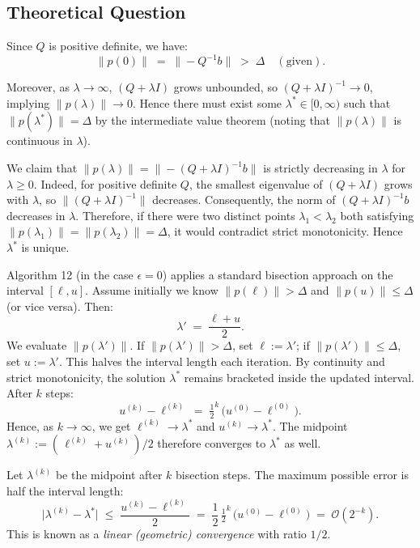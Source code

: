 \documentclass[12pt]{article}
\begin{document}
\subsection{Theoretical Question}
Since \(Q\) is positive definite, we have:
\[
\|p(0)\| \;=\;\|-Q^{-1}b\|\;>\;\Delta \quad (\text{given}).
\]

Moreover, as \(\lambda\to \infty\), \((Q + \lambda I)\) grows unbounded, so \((Q+\lambda I)^{-1}\to 0\), implying \(\|p(\lambda)\|\to 0\). Hence there must exist some \(\lambda^*\in [0,\infty)\) such that \(\|p(\lambda^*)\| = \Delta\) by the intermediate value theorem (noting that \(\|p(\lambda)\|\) is continuous in \(\lambda\)).

We claim that \(\|p(\lambda)\| = \|-(Q+\lambda I)^{-1}b\|\) is strictly decreasing in \(\lambda\) for \(\lambda \ge 0\). Indeed, for positive definite \(Q\), the smallest eigenvalue of \((Q+\lambda I)\) grows with \(\lambda\), so \(\|(Q+\lambda I)^{-1}\|\) decreases. Consequently, the norm of \((Q+\lambda I)^{-1}b\) decreases in \(\lambda\).  
Therefore, if there were two distinct points \(\lambda_1 < \lambda_2\) both satisfying \(\|p(\lambda_1)\|=\|p(\lambda_2)\|=\Delta\), it would contradict strict monotonicity. Hence \(\lambda^*\) is unique.

Algorithm 12 (in the case \(\epsilon=0\)) applies a standard bisection approach on the interval \([\ell,u]\). Assume initially we know \(\|p(\ell)\|>\Delta\) and \(\|p(u)\|\le \Delta\) (or vice versa). Then:
\[
\lambda' \;=\;\frac{\ell + u}{2}.
\]
We evaluate \(\|p(\lambda')\|\). If \(\|p(\lambda')\| > \Delta\), set \(\ell:=\lambda'\);  
if \(\|p(\lambda')\|\le \Delta\), set \(u:=\lambda'\). This halves the interval length each iteration. By continuity and strict monotonicity, the solution \(\lambda^*\) remains bracketed inside the updated interval. After \(k\) steps:
\[
u^{(k)} - \ell^{(k)} \;=\;\tfrac12^k\,\bigl(u^{(0)} - \ell^{(0)}\bigr).
\]
Hence, as \(k\to\infty\), we get \(\ell^{(k)}\to \lambda^*\) and \(u^{(k)}\to \lambda^*\). The midpoint \(\lambda^{(k)} := (\,\ell^{(k)}+u^{(k)}\,)/2\) therefore converges to \(\lambda^*\) as well.

Let \(\lambda^{(k)}\) be the midpoint after \(k\) bisection steps. The maximum possible error is half the interval length:
\[
\bigl|\lambda^{(k)} - \lambda^*\bigr| \;\le\; \frac{u^{(k)}-\ell^{(k)}}{2}
\;=\;\frac{1}{2}\,\tfrac12^k\,\bigl(u^{(0)} - \ell^{(0)}\bigr)
\;=\;
\mathcal{O}(2^{-k}).
\]
This is known as a \textit{linear (geometric) convergence} with ratio \(1/2\).
\end{document}
